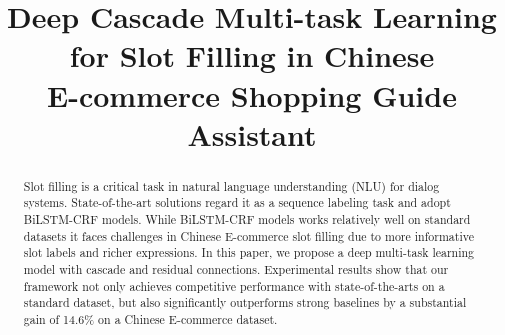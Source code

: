 \documentclass[11pt,a4paper]{article}
\title{Deep Cascade Multi-task Learning for Slot Filling in Chinese\\ E-commerce Shopping Guide Assistant}
\date{}
\begin{document}
\maketitle
\begin{abstract}
  Slot filling is a critical task in natural language understanding
  (NLU) for dialog systems.
  State-of-the-art solutions regard it as a sequence labeling task 
  and adopt BiLSTM-CRF models.
  While BiLSTM-CRF models works relatively well on standard datasets 
  it faces challenges in Chinese E-commerce slot filling due to 
  more informative slot labels and richer expressions.
  In this paper, we propose a deep multi-task learning model
  with cascade and residual connections.
  Experimental results show that our framework 
  not only achieves competitive performance with state-of-the-arts
  on a standard dataset, but also significantly outperforms
  strong baselines by a substantial gain of 14.6\% 
  on a Chinese E-commerce dataset.
\end{abstract}

\begin{CJK}{UTF8}{gbsn}
	
	
	
	
	
	
	
	
	
	
	
	
	
\end{CJK}





\end{document}
